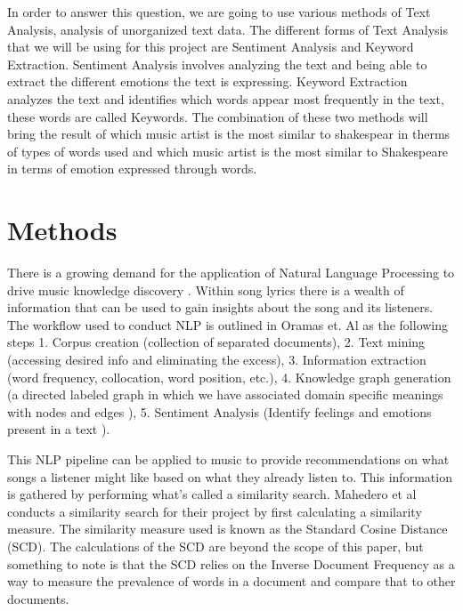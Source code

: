 \documentclass[11pt]{article}
\begin{document}
\noindent In order to answer this question, we are going to use various methods of Text Analysis, analysis of unorganized text data\cite{monkey}. The different forms of Text Analysis that we will be using for this project are Sentiment Analysis and Keyword Extraction. Sentiment Analysis involves analyzing the text and being able to extract the different emotions the text is expressing\cite{monkey}. Keyword Extraction analyzes the text and identifies which words appear most frequently in the text, these words are called Keywords\cite{monkey}. The combination of these two methods will bring the result of which music artist is the most similar to shakespear in therms of types of words used and which music artist is the most similar to Shakespeare in terms of emotion expressed through words.  

\section{Methods}
There is a growing demand for the application of Natural Language Processing to drive music knowledge discovery \cite{NLP-for-lyrics}. Within song lyrics there is a wealth of information that can be used to gain insights about the song and its listeners. The workflow used to conduct NLP is outlined in Oramas et. Al \cite{NLP-for-music} as the following steps 1. Corpus creation (collection of separated documents), 2. Text mining (accessing desired info and eliminating the excess), 3. Information extraction (word frequency, collocation, word position, etc.), 4. Knowledge graph generation (a directed labeled graph in which we have associated domain specific meanings with nodes and edges \cite{knowledge-graphs}), 5. Sentiment Analysis (Identify feelings and emotions present in a text \cite{monkey}).
 
\noindent This NLP pipeline can be applied to music to provide recommendations on what songs a listener might like based on what they already listen to. \cite{NLP-for-lyrics} This information is gathered by performing what’s called a similarity search. Mahedero et al \cite{NLP-for-lyrics} conducts a similarity search for their project by first calculating a similarity measure. The similarity measure used is known as the Standard Cosine Distance (SCD). The calculations of the SCD are beyond the scope of this paper, but something to note is that the SCD relies on the Inverse Document Frequency as a way to measure the prevalence of words in a document and compare that to other documents. 
\end{document}
